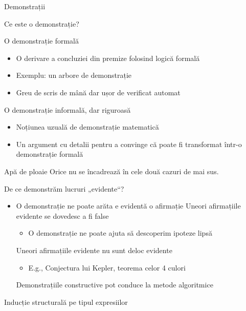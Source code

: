 \documentclass[xcolor=pdftex,romanian,colorlinks,handout]{beamer}
\begin{document}
\begin{section}{Demonstrații}


\begin{frame}{Ce este o demonstrație?}
\begin{block}{O demonstrație formală}
\begin{itemize}
\item O derivare a concluziei din premize folosind logică formală
\item Exemplu: un arbore de demonstrație
\item Greu de scris de mână dar ușor de verificat automat
\end {itemize}
\end{block}
\begin{block}{O demonstrație informală, dar riguroasă}
\begin{itemize}
\item Noțiunea uzuală de demonstrație matematică
\item Un argument cu  detalii pentru a convinge că poate fi transformat într-o demonstrație formală
\end {itemize}
\end{block}
\begin{block}{Apă de ploaie}
Orice nu se încadrează în cele două cazuri de mai sus.
\end {block}
\end{frame}

\begin{frame}{De ce demonstrăm lucruri „evidente“?}
\begin{itemize}
\item<1-> O demonstrație ne poate arăta  e evidentă o afirmație
 Uneori afirmațiile evidente se dovedesc a fi \alert{false}
\begin{itemize}
\item<3-> O demonstrație ne poate ajuta să descoperim ipoteze lipsă
\end{itemize}
 Uneori afirmațiile evidente nu sunt deloc evidente
\begin{itemize}
\item<4-> E.g., Conjectura lui Kepler, teorema celor 4 culori
\end{itemize}
 Demonstrațiile constructive pot conduce la metode algoritmice
\end{itemize}
\end{frame}



\begin{subsection}{Inducție structurală pe tipul expresiilor}


\end{subsection}
\end{section}
\end{document}
